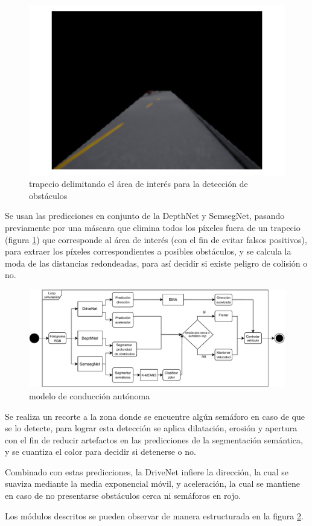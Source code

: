 		\begin{figure}[H]
			\centering
			\includegraphics[scale=0.5]{imagenes/trapecio}
			\caption[Delimitado del área de interés para la detección de objetos]{trapecio delimitando el área de interés para la detección de obstáculos}
			\label{trapecio}
		\end{figure}
		
		Se usan las predicciones en conjunto de la DepthNet y SemsegNet, pasando previamente por una máscara que elimina todos los píxeles fuera de un trapecio (figura \ref{trapecio}) que corresponde al área de interés (con el fin de evitar falsos positivos), para extraer los píxeles correspondientes a posibles obstáculos, y se calcula la moda de las distancias redondeadas, para así decidir si existe peligro de colisión o no.
		
		\begin{figure}[H]
			\centering
			\includegraphics[scale=0.73]{imagenes/arquitectura_inferencia}
			\caption[Modelo de conducción autónoma]{modelo de conducción autónoma}
			\label{model}
		\end{figure}
		
		Se realiza un recorte a la zona donde se encuentre algún semáforo en caso de que se lo detecte, para lograr esta detección se aplica dilatación, erosión y apertura con el fin de reducir artefactos en las predicciones de la segmentación semántica, y se cuantiza el color para decidir si detenerse o no.
		
		Combinado con estas predicciones, la DriveNet infiere la dirección, la cual se suaviza mediante la media exponencial móvil, y aceleración, la cual se mantiene en caso de no presentarse obstáculos cerca ni semáforos en rojo.
		
		Los módulos descritos se pueden observar de manera estructurada en la figura \ref{model}.